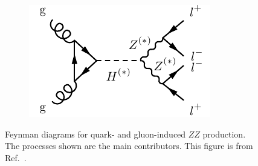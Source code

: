 \begin{figure}
\begin{subfigure}{.24\textwidth}
  \caption{\ggZZ}
  \label{fig:m4lfeynman:ggZZ}
\end{subfigure}
\begin{subfigure}{.24\textwidth}
  \centering
  \includegraphics[width=.99\textwidth]{Figures/FeynGraphs/ggZZ4lhiggs.pdf}
  \caption{\HZZFourL}
  \label{fig:m4lfeynman:ggHZZ}
\end{subfigure}
\caption{Feynman diagrams for quark- and gluon-induced $ZZ$ production. The processes shown are the main contributors. This figure is from Ref.~\cite{m4l2021_paper}.}
\label{fig:m4lfeynman}
\end{figure}

